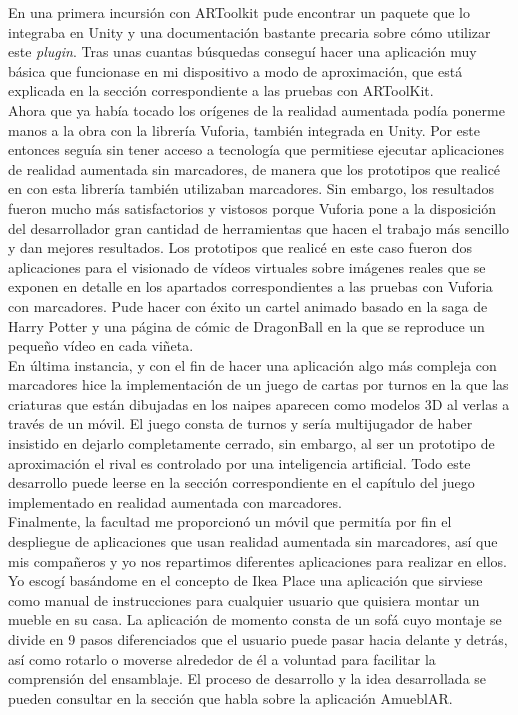 En una primera incursión con ARToolkit pude encontrar un paquete que lo integraba en Unity y una documentación bastante precaria sobre cómo utilizar este \textit{plugin}. Tras unas cuantas búsquedas conseguí hacer una aplicación muy básica que funcionase en mi dispositivo a modo de aproximación, que está explicada en la sección correspondiente a las pruebas con ARToolKit.\\

Ahora que ya había tocado los orígenes de la realidad aumentada podía ponerme manos a la obra con la librería
Vuforia, también integrada en Unity. Por este entonces seguía sin tener acceso a tecnología que permitiese ejecutar aplicaciones de realidad aumentada sin marcadores, de manera que los prototipos que realicé en con esta librería también utilizaban marcadores. Sin embargo, los resultados fueron mucho más satisfactorios y vistosos porque Vuforia pone a la disposición del desarrollador gran cantidad de herramientas que hacen el trabajo más sencillo y dan mejores resultados. Los prototipos que realicé en este caso fueron dos aplicaciones para el visionado de vídeos virtuales sobre imágenes reales que se exponen en detalle en los apartados correspondientes a las pruebas con Vuforia con marcadores. Pude hacer con éxito un cartel animado basado en la saga de Harry Potter y una página de cómic de DragonBall en la que se reproduce un pequeño vídeo en cada viñeta.\\

En última instancia, y con el fin de hacer una aplicación algo más compleja con marcadores hice la implementación de un juego de cartas por turnos en la que las criaturas que están dibujadas en los naipes aparecen como modelos 3D al verlas a través de un móvil. El juego consta de turnos y sería multijugador de haber insistido en dejarlo completamente cerrado, sin embargo, al ser un prototipo de aproximación el rival es controlado por una inteligencia artificial. Todo este desarrollo puede leerse en la sección correspondiente en el capítulo del juego implementado en realidad aumentada con marcadores.\\

Finalmente, la facultad me proporcionó un móvil que permitía por fin el despliegue de aplicaciones que usan realidad aumentada sin marcadores, así que mis compañeros y yo nos repartimos diferentes aplicaciones para realizar en ellos. Yo escogí basándome en el concepto de Ikea Place una aplicación que sirviese como manual de instrucciones para cualquier usuario que quisiera montar un mueble en su casa. La aplicación de momento consta de un sofá cuyo montaje se divide en 9 pasos diferenciados que el usuario puede pasar hacia delante y detrás, así como rotarlo o moverse alrededor de él a voluntad para facilitar la comprensión del ensamblaje. El proceso de desarrollo y la idea desarrollada se pueden consultar en la sección que habla sobre la aplicación AmueblAR.\\


